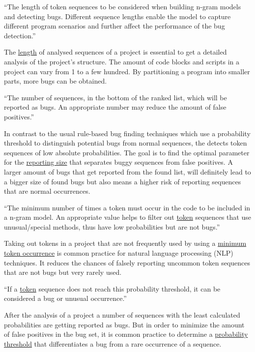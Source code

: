 \begin{definition}\label{def:sequence_length}
    ``The length of token sequences to be considered when building n-gram models and detecting bugs. Different sequence lengths enable the model to capture different program scenarios and further affect the performance of the bug detection.''~\cite{bugram}
\end{definition}

The \hyperref[def:sequence_length]{length} of analysed sequences of a project is essential to get a detailed analysis of the project's structure. The amount of code blocks and scripts in a \scratch{} project can vary from 1 to a few hundred. By partitioning a program into smaller parts, more bugs can be obtained.

\begin{definition}\label{def:reporting_size}
    ``The number of sequences, in the bottom of the ranked list, which will be reported as bugs. An appropriate number may reduce the amount of false positives.''~\cite{bugram}
\end{definition}

In contrast to the usual rule-based bug finding techniques which use a probability threshold to distinguish potential bugs from normal sequences, the \ngram{} detects token sequences of low absolute probabilities. The goal is to find the optimal parameter for the \hyperref[def:reporting_size]{reporting size} that separates buggy sequences from false positives. A larger amount of bugs that get reported from the found list, will definitely lead to a bigger size of found bugs but also means a higher risk of reporting sequences that are normal occurrences.

\begin{definition}\label{def:minimum_token_occurrence}
    ``The minimum number of times a token must occur in the code to be included in a n-gram model. An appropriate value helps to filter out \hyperref[def:token]{token} sequences that use unusual/special methods, thus have low probabilities but are not bugs.''~\cite{bugram}
\end{definition}

Taking out tokens in a project that are not frequently used by using a \hyperref[def:minimum_token_occurrence]{minimum token occurrence} is common practice for natural language processing (NLP) techniques. It reduces the chances of falsely reporting uncommon token sequences that are not bugs but very rarely used. 

\begin{definition}\label{def:probability_threshold}
    ``If a \hyperref[def:token]{token} sequence does not reach this probability threshold, it can be considered a bug or unusual occurrence.''
\end{definition}

After the analysis of a project a number of sequences with the least calculated probabilities are getting reported as bugs. But in order to minimize the amount of false positives in the bug set, it is common practice to determine a \hyperref[def:probability_threshold]{probability threshold} that differentiates a bug from a rare occurrence of a sequence. 
